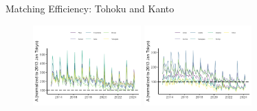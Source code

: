 \documentclass[aspectratio=169]{beamer}
\begin{document}
\begin{frame}{Matching Efficiency: Tohoku and Kanto}
\begin{figure}[!ht]
  \begin{center}

  \includegraphics[width = 0.37\textwidth]
  {figuretable/matching_efficiency_month_aggregate_tohoku.png}
  \includegraphics[width = 0.37\textwidth]
  {figuretable/matching_efficiency_month_aggregate_kanto.png}
  \end{center}
  \footnotesize
\end{figure} 
\end{frame}
\end{document}
